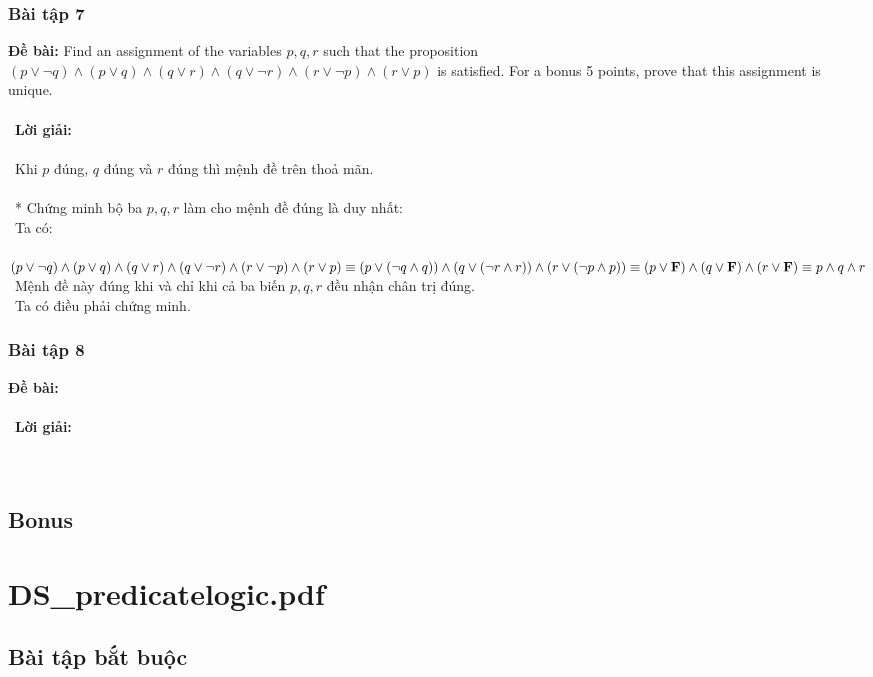 \documentclass[a4paper]{article}
\begin{document}
\subsubsection{Bài tập 7}
\textbf{Đề bài: }Find an assignment of the variables $p, q, r$ such that the proposition $(p \lor \lnot q) \land (p \lor q) \land (q \lor r) \land (q \lor \lnot r) \land (r \lor \lnot p) \land (r \lor p)$ is satisfied. For a bonus 5 points, prove that this assignment is unique. \\\ \\\
\textbf{Lời giải:} \\\ \\\
Khi $p$ đúng, $q$ đúng và $r$ đúng thì mệnh đề trên thoả mãn. \\\ \\\
* Chứng minh bộ ba $p,q,r$ làm cho mệnh đề đúng là duy nhất: \\\
Ta có: \\\
$(p \lor \lnot q) \land (p \lor q) \land (q \lor r) \land (q \lor \lnot r) \land (r \lor \lnot p) \land (r \lor p) \\\equiv  (p \lor (\lnot q \land q)) \land (q \lor (\lnot r \land r)) \land (r \lor (\lnot p \land p))\\\equiv (p \lor \textbf{F}) \land (q \lor \textbf{F}) \land (r \lor \textbf{F}) \\\equiv p \land q \land r$ \\\
Mệnh đề này đúng khi và chỉ khi cả ba biến $p,q,r$ đều nhận chân trị đúng. \\\
Ta có điều phải chứng minh.
\clearpage
\subsubsection{Bài tập 8}
\textbf{Đề bài:} 
\\\ \\\
\textbf{Lời giải:} \\\ \\\
\clearpage
\subsection{Bonus}

\clearpage

\section{DS\_predicatelogic.pdf}
\subsection{Bài tập bắt buộc}
\end{document}
